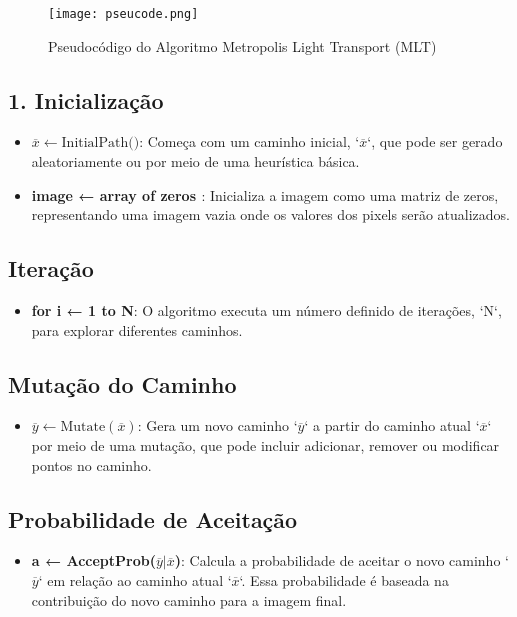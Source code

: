 \documentclass{article}
\begin{document}
\begin{figure}[h!]
    \centering
    \texttt{[image: pseucode.png]}
    \caption{Pseudocódigo do Algoritmo Metropolis Light Transport (MLT)}
    \label{fig:pseudocode}
\end{figure}

\subsection{1. Inicialização}
\begin{itemize}
    \item \(\overline{x} \leftarrow \text{InitialPath()}\): Começa com um caminho inicial, `\(\overline{x}\)`, que pode ser gerado aleatoriamente ou por meio de uma heurística básica.
    \item \textbf{image ← { array of zeros }}: Inicializa a imagem como uma matriz de zeros, representando uma imagem vazia onde os valores dos pixels serão atualizados.
\end{itemize}

\subsection{Iteração}
\begin{itemize}
    \item \textbf{for i ← 1 to N}: O algoritmo executa um número definido de iterações, `N`, para explorar diferentes caminhos.
\end{itemize}

\subsection{Mutação do Caminho}
\begin{itemize}
    \item \(\overline{y} \leftarrow \text{Mutate}(\overline{x})\): Gera um novo caminho `\(\overline{y}\)` a partir do caminho atual `\(\overline{x}\)` por meio de uma mutação, que pode incluir adicionar, remover ou modificar pontos no caminho.
\end{itemize}

\subsection{Probabilidade de Aceitação}
\begin{itemize}
    \item \textbf{a ← AcceptProb(\(\overline{y}|\overline{x}\))}: Calcula a probabilidade de aceitar o novo caminho `\(\overline{y}\)` em relação ao caminho atual `\(\overline{x}\)`. Essa probabilidade é baseada na contribuição do novo caminho para a imagem final.
\end{itemize}
\end{document}
